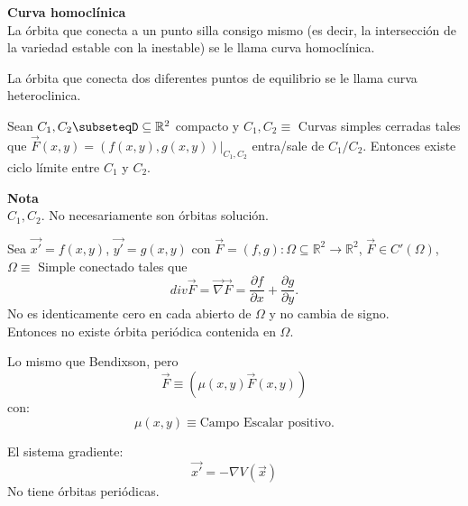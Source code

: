 \begin{definition}
	\textbf{Curva homoclínica}\\
	La órbita que conecta a un punto silla consigo mismo (es decir, la intersección de la variedad estable con la inestable)
	se le llama curva homoclínica.
\end{definition}

\begin{definition}
	La órbita que conecta dos diferentes puntos de equilibrio se le llama curva heteroclinica.
\end{definition}

\begin{theorem}
	Sean $C_1,C_2\subseteqD\subseteq\mathbb{R}^2$ compacto y $C_1,C_2\equiv$ Curvas simples cerradas tales que
	$\vec{F}(x,y)=(f(x,y),g(x,y))|_{C_1,C_2}$ entra/sale de $C_1/C_2$. Entonces existe ciclo límite entre $C_1$ y $C_2$.
\end{theorem}

\textbf{Nota}\\
$C_1,C_2$. No necesariamente son órbitas solución.

\begin{theorem}
	Sea $\vec{x'}=f(x,y)$, $\vec{y'}=g(x,y)$ con $\vec{F}=(f,g):\Omega\subseteq\mathbb{R}^2\to\mathbb{R}^2$, $\vec{F}\in C'(\Omega)$,
	$\Omega\equiv$ Simple conectado tales que
	$$div\vec{F}=\vec{\nabla}\vec{F}=\frac{\partial f}{\partial x}+\frac{\partial g}{\partial y}.$$
	No es identicamente cero en cada abierto de $\Omega$ y no cambia de signo.\\
	Entonces no existe órbita periódica contenida en $\Omega$.
\end{theorem}

\begin{theorem}
	Lo mismo que Bendixson, pero
	$$\vec{F}\equiv(\mu(x,y)\vec{F}(x,y))$$
	con:
	$$\mu(x,y)\equiv\text{Campo Escalar positivo}.$$
\end{theorem}

\begin{theorem}
	El sistema gradiente:
	$$\vec{x'}=-\nabla V(\vec{x})$$
	No tiene órbitas periódicas.
\end{theorem}


